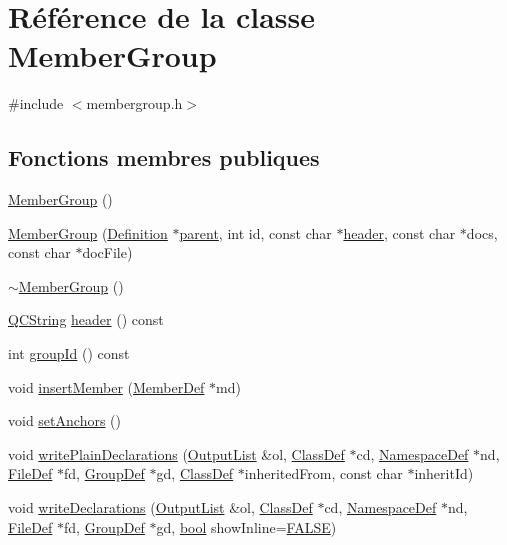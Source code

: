 \hypertarget{class_member_group}{}\section{Référence de la classe Member\+Group}
\label{class_member_group}


{\ttfamily \#include $<$membergroup.\+h$>$}

\subsection*{Fonctions membres publiques}
\begin{DoxyCompactItemize}
\item 
\hyperlink{class_member_group_a1156cafe3706235b15ad40d35a277508}{Member\+Group} ()
\item 
\hyperlink{class_member_group_a3dd6201cb2e5c87fd85c69cf22a61e54}{Member\+Group} (\hyperlink{class_definition}{Definition} $\ast$\hyperlink{class_member_group_ad2bc2ef2ee3955e0b3f8b5c69102ad3c}{parent}, int id, const char $\ast$\hyperlink{class_member_group_a6b56ca15d231631824ba01e61073f252}{header}, const char $\ast$docs, const char $\ast$doc\+File)
\item 
\hyperlink{class_member_group_a1456befb5de1426df31292b0a844a8ac}{$\sim$\+Member\+Group} ()
\item 
\hyperlink{class_q_c_string}{Q\+C\+String} \hyperlink{class_member_group_a6b56ca15d231631824ba01e61073f252}{header} () const 
\item 
int \hyperlink{class_member_group_aa4bad16fa7adcc24c8e997df6031b078}{group\+Id} () const 
\item 
void \hyperlink{class_member_group_ad7b02bac5d0ed254d5c979b19cf4ae1e}{insert\+Member} (\hyperlink{class_member_def}{Member\+Def} $\ast$md)
\item 
void \hyperlink{class_member_group_a325068f062701fe19500cfe9f88e9ef2}{set\+Anchors} ()
\item 
void \hyperlink{class_member_group_a12b86dc316ffa3e35a32459f4cb1c11f}{write\+Plain\+Declarations} (\hyperlink{class_output_list}{Output\+List} \&ol, \hyperlink{class_class_def}{Class\+Def} $\ast$cd, \hyperlink{class_namespace_def}{Namespace\+Def} $\ast$nd, \hyperlink{class_file_def}{File\+Def} $\ast$fd, \hyperlink{class_group_def}{Group\+Def} $\ast$gd, \hyperlink{class_class_def}{Class\+Def} $\ast$inherited\+From, const char $\ast$inherit\+Id)
\item 
void \hyperlink{class_member_group_af5b7e6ea9ecd6ad33aa40e863fb9e809}{write\+Declarations} (\hyperlink{class_output_list}{Output\+List} \&ol, \hyperlink{class_class_def}{Class\+Def} $\ast$cd, \hyperlink{class_namespace_def}{Namespace\+Def} $\ast$nd, \hyperlink{class_file_def}{File\+Def} $\ast$fd, \hyperlink{class_group_def}{Group\+Def} $\ast$gd, \hyperlink{qglobal_8h_a1062901a7428fdd9c7f180f5e01ea056}{bool} show\+Inline=\hyperlink{qglobal_8h_a10e004b6916e78ff4ea8379be80b80cc}{F\+A\+L\+S\+E})

\end{DoxyCompactItemize}
